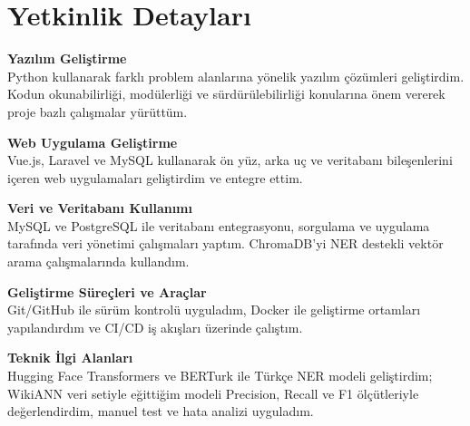 \section*{Yetkinlik Detayları}

\textbf{Yazılım Geliştirme} \\
Python kullanarak farklı problem alanlarına yönelik yazılım çözümleri geliştirdim. Kodun okunabilirliği, modülerliği ve sürdürülebilirliği konularına önem vererek proje bazlı çalışmalar yürüttüm.

\vspace{0.2cm}

\textbf{Web Uygulama Geliştirme} \\
Vue.js, Laravel ve MySQL kullanarak ön yüz, arka uç ve veritabanı bileşenlerini içeren web uygulamaları geliştirdim ve entegre ettim.

\vspace{0.2cm}

\textbf{Veri ve Veritabanı Kullanımı} \\
MySQL ve PostgreSQL ile veritabanı entegrasyonu, sorgulama ve uygulama tarafında veri yönetimi çalışmaları yaptım. ChromaDB'yi NER destekli vektör arama çalışmalarında kullandım.

\vspace{0.2cm}

\textbf{Geliştirme Süreçleri ve Araçlar} \\
Git/GitHub ile sürüm kontrolü uyguladım, Docker ile geliştirme ortamları yapılandırdım ve CI/CD iş akışları üzerinde çalıştım.

\vspace{0.2cm}

\textbf{Teknik İlgi Alanları} \\
Hugging Face Transformers ve BERTurk ile Türkçe NER modeli geliştirdim; WikiANN veri setiyle eğittiğim modeli Precision, Recall ve F1 ölçütleriyle değerlendirdim, manuel test ve hata analizi uyguladım.
